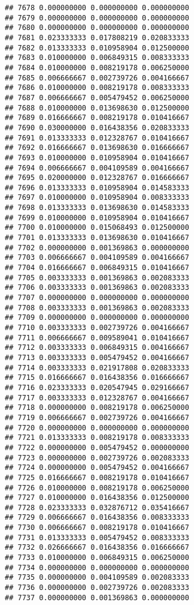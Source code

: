 \documentclass[
]{article}
\begin{document}
\begin{verbatim}
## 7678 0.000000000 0.000000000 0.000000000
## 7679 0.000000000 0.000000000 0.000000000
## 7680 0.000000000 0.000000000 0.000000000
## 7681 0.023333333 0.017808219 0.020833333
## 7682 0.013333333 0.010958904 0.012500000
## 7683 0.010000000 0.006849315 0.008333333
## 7684 0.010000000 0.008219178 0.006250000
## 7685 0.006666667 0.002739726 0.004166667
## 7686 0.010000000 0.008219178 0.008333333
## 7687 0.006666667 0.005479452 0.006250000
## 7688 0.010000000 0.013698630 0.012500000
## 7689 0.016666667 0.008219178 0.010416667
## 7690 0.030000000 0.016438356 0.020833333
## 7691 0.013333333 0.012328767 0.010416667
## 7692 0.016666667 0.013698630 0.016666667
## 7693 0.010000000 0.010958904 0.010416667
## 7694 0.006666667 0.004109589 0.004166667
## 7695 0.020000000 0.012328767 0.016666667
## 7696 0.013333333 0.010958904 0.014583333
## 7697 0.010000000 0.010958904 0.008333333
## 7698 0.013333333 0.013698630 0.014583333
## 7699 0.010000000 0.010958904 0.010416667
## 7700 0.010000000 0.015068493 0.012500000
## 7701 0.013333333 0.013698630 0.010416667
## 7702 0.000000000 0.001369863 0.000000000
## 7703 0.006666667 0.004109589 0.004166667
## 7704 0.016666667 0.006849315 0.010416667
## 7705 0.003333333 0.001369863 0.002083333
## 7706 0.003333333 0.001369863 0.002083333
## 7707 0.000000000 0.000000000 0.000000000
## 7708 0.003333333 0.001369863 0.002083333
## 7709 0.000000000 0.000000000 0.000000000
## 7710 0.003333333 0.002739726 0.004166667
## 7711 0.006666667 0.009589041 0.010416667
## 7712 0.003333333 0.006849315 0.004166667
## 7713 0.003333333 0.005479452 0.004166667
## 7714 0.003333333 0.021917808 0.020833333
## 7715 0.016666667 0.016438356 0.016666667
## 7716 0.023333333 0.020547945 0.029166667
## 7717 0.003333333 0.012328767 0.004166667
## 7718 0.000000000 0.008219178 0.006250000
## 7719 0.006666667 0.002739726 0.004166667
## 7720 0.000000000 0.000000000 0.000000000
## 7721 0.013333333 0.008219178 0.008333333
## 7722 0.000000000 0.005479452 0.000000000
## 7723 0.000000000 0.002739726 0.002083333
## 7724 0.000000000 0.005479452 0.004166667
## 7725 0.016666667 0.008219178 0.010416667
## 7726 0.010000000 0.008219178 0.006250000
## 7727 0.010000000 0.016438356 0.012500000
## 7728 0.023333333 0.032876712 0.035416667
## 7729 0.006666667 0.016438356 0.008333333
## 7730 0.006666667 0.008219178 0.010416667
## 7731 0.013333333 0.005479452 0.008333333
## 7732 0.026666667 0.016438356 0.016666667
## 7733 0.010000000 0.006849315 0.006250000
## 7734 0.000000000 0.000000000 0.000000000
## 7735 0.000000000 0.004109589 0.002083333
## 7736 0.000000000 0.002739726 0.002083333
## 7737 0.000000000 0.001369863 0.000000000

\end{verbatim}
\end{document}

